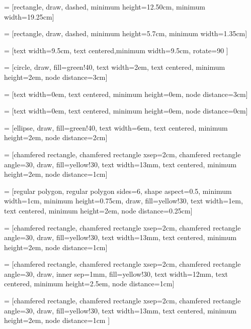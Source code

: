 \usepackage{tikz}
\usetikzlibrary{tikzmark}
\usetikzlibrary{shapes,arrows,arrows.meta,positioning}
\usetikzlibrary{shapes.multipart}

\newcommand{\MainlineShiftX}{0mm}
\newcommand{\AssignInFig}[2]{\makebox[5mm][l]{\ensuremath{#1}}\ensuremath{\gets#2}}

 = [rectangle, draw, dashed, minimum height=12.50cm, minimum width=19.25cm]

 = [rectangle, draw, dashed, minimum height=5.7cm, minimum width=1.35cm]

 = [text width=9.5cm, text centered,minimum width=9.5cm, rotate=90 ]

 = [circle, draw, fill=green!40, text width=2em, text centered, minimum height=2em, node distance=3cm]

 = [text width=0em, text centered, minimum height=0em, node distance=3cm]

 = [text width=0em, text centered, minimum height=0em, node distance=0cm]

 = [ellipse, draw, fill=green!40, text width=6em, text centered, minimum height=2em, node distance=2cm]

 = [chamfered rectangle, chamfered rectangle xsep=2cm, chamfered rectangle angle=30, draw, fill=yellow!30, text width=13mm, text centered, minimum height=2em, node distance=1cm]

 = [regular polygon, regular polygon sides=6, shape aspect=0.5, minimum width=1cm, minimum height=0.75cm, draw, fill=yellow!30, text width=1em, text centered, minimum height=2em, node distance=0.25cm]

 = [chamfered rectangle, chamfered rectangle xsep=2cm, chamfered rectangle angle=30, draw, fill=yellow!30, text width=13mm, text centered, minimum height=2em, node distance=1cm]

 = [chamfered rectangle, chamfered rectangle xsep=2cm, chamfered rectangle angle=30, draw, inner sep=1mm, fill=yellow!30, text width=12mm, text centered, minimum height=2.5em, node distance=1cm]

 = [chamfered rectangle, chamfered rectangle xsep=2cm, chamfered rectangle angle=30, draw, fill=yellow!30, text width=13mm, text centered, minimum height=2em, node distance=1cm ]

